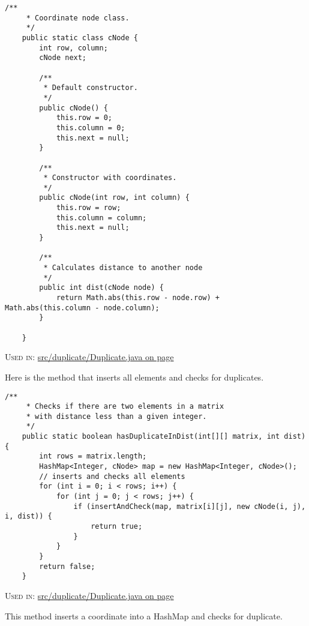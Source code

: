 \begin{lstlisting}[title={<Coordinate Node Class 4>}, label=Listing4]
    /**
     * Coordinate node class.
     */
    public static class cNode {
        int row, column;
        cNode next;

        /**
         * Default constructor.
         */
        public cNode() {
            this.row = 0;
            this.column = 0;
            this.next = null;
        }

        /**
         * Constructor with coordinates.
         */
        public cNode(int row, int column) {
            this.row = row;
            this.column = column;
            this.next = null;
        }

        /**
         * Calculates distance to another node
         */
        public int dist(cNode node) {
            return Math.abs(this.row - node.row) + Math.abs(this.column - node.column);
        }

    }
\end{lstlisting}\begin{footnotesize} \textsc{Used in}: \hyperref[Listing1]{s\-r\-c\-/\-d\-u\-p\-l\-i\-c\-a\-t\-e\-/\-D\-u\-p\-l\-i\-c\-a\-t\-e\-.\-j\-a\-v\-a on page} \pageref{Listing1}  \end{footnotesize}\vskip 5mm\noindent
Here is the method that inserts all elements and checks for duplicates.
\begin{lstlisting}[title={<Duplicate Check 5>}, label=Listing5]
    /**
     * Checks if there are two elements in a matrix
     * with distance less than a given integer.
     */
    public static boolean hasDuplicateInDist(int[][] matrix, int dist) {
        int rows = matrix.length;
        HashMap<Integer, cNode> map = new HashMap<Integer, cNode>();
        // inserts and checks all elements
        for (int i = 0; i < rows; i++) {
            for (int j = 0; j < rows; j++) {
                if (insertAndCheck(map, matrix[i][j], new cNode(i, j), i, dist)) {
                    return true;
                }
            }
        }
        return false;
    }
\end{lstlisting}\begin{footnotesize} \textsc{Used in}: \hyperref[Listing1]{s\-r\-c\-/\-d\-u\-p\-l\-i\-c\-a\-t\-e\-/\-D\-u\-p\-l\-i\-c\-a\-t\-e\-.\-j\-a\-v\-a on page} \pageref{Listing1}  \end{footnotesize}\vskip 5mm\noindent
This method inserts a coordinate into a HashMap and checks for duplicate.
